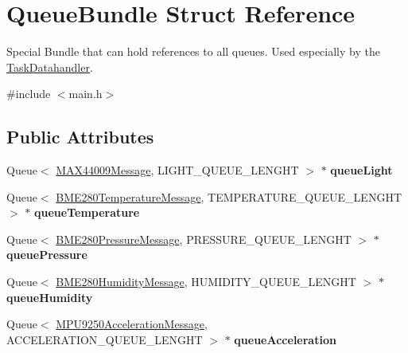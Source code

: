 \hypertarget{struct_queue_bundle}{}\section{Queue\+Bundle Struct Reference}
\label{struct_queue_bundle}


Special Bundle that can hold references to all queues. Used especially by the \hyperlink{class_task_datahandler}{Task\+Datahandler}.  




{\ttfamily \#include $<$main.\+h$>$}

\subsection*{Public Attributes}
\begin{DoxyCompactItemize}
\item 
\hypertarget{struct_queue_bundle_adcfe56ee59fa20a5bf6624a94bea6469}{}Queue$<$ \hyperlink{class_m_a_x44009_message}{M\+A\+X44009\+Message}, L\+I\+G\+H\+T\+\_\+\+Q\+U\+E\+U\+E\+\_\+\+L\+E\+N\+G\+H\+T $>$ $\ast$ {\bfseries queue\+Light}\label{struct_queue_bundle_adcfe56ee59fa20a5bf6624a94bea6469}

\item 
\hypertarget{struct_queue_bundle_af4d5eaad446d667b61e70517f466d564}{}Queue$<$ \hyperlink{class_b_m_e280_temperature_message}{B\+M\+E280\+Temperature\+Message}, T\+E\+M\+P\+E\+R\+A\+T\+U\+R\+E\+\_\+\+Q\+U\+E\+U\+E\+\_\+\+L\+E\+N\+G\+H\+T $>$ $\ast$ {\bfseries queue\+Temperature}\label{struct_queue_bundle_af4d5eaad446d667b61e70517f466d564}

\item 
\hypertarget{struct_queue_bundle_acbd3f4d53bc8d7ebe323aa8fc05c8364}{}Queue$<$ \hyperlink{class_b_m_e280_pressure_message}{B\+M\+E280\+Pressure\+Message}, P\+R\+E\+S\+S\+U\+R\+E\+\_\+\+Q\+U\+E\+U\+E\+\_\+\+L\+E\+N\+G\+H\+T $>$ $\ast$ {\bfseries queue\+Pressure}\label{struct_queue_bundle_acbd3f4d53bc8d7ebe323aa8fc05c8364}

\item 
\hypertarget{struct_queue_bundle_a31a23415f107f6e5bcc673277c438d70}{}Queue$<$ \hyperlink{class_b_m_e280_humidity_message}{B\+M\+E280\+Humidity\+Message}, H\+U\+M\+I\+D\+I\+T\+Y\+\_\+\+Q\+U\+E\+U\+E\+\_\+\+L\+E\+N\+G\+H\+T $>$ $\ast$ {\bfseries queue\+Humidity}\label{struct_queue_bundle_a31a23415f107f6e5bcc673277c438d70}

\item 
\hypertarget{struct_queue_bundle_a5b2502e92f233bb62aac7a4052773485}{}Queue$<$ \hyperlink{class_m_p_u9250_acceleration_message}{M\+P\+U9250\+Acceleration\+Message}, A\+C\+C\+E\+L\+E\+R\+A\+T\+I\+O\+N\+\_\+\+Q\+U\+E\+U\+E\+\_\+\+L\+E\+N\+G\+H\+T $>$ $\ast$ {\bfseries queue\+Acceleration}\label{struct_queue_bundle_a5b2502e92f233bb62aac7a4052773485}


\end{DoxyCompactItemize}
